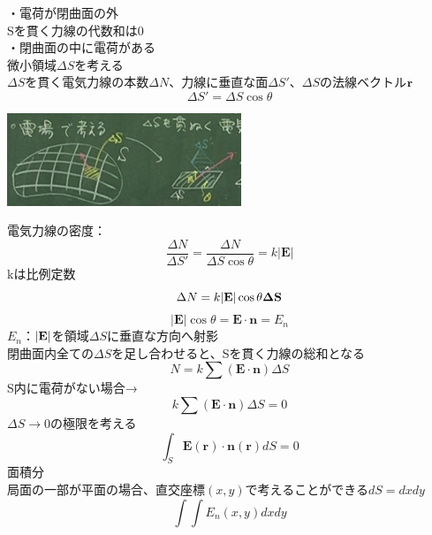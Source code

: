 \documentclass{jsarticle}
\begin{document}
		{\Large ・電荷が閉曲面の外}\\
		Sを貫く力線の代数和は{\Large 0}\\
		{\Large ・閉曲面の中に電荷がある}\\
		微小領域$\Delta S$を考える\\
		$\Delta S$を貫く電気力線の本数$\Delta N$、力線に垂直な面$\Delta S'$、$\Delta S$の法線ベクトル$\bf r$\\
		\[
			\Delta S'=\Delta S \cos \theta
		\]
		\begin{center}
			\includegraphics[width=7cm]{5_10_10.JPG}
		\end{center}
		電気力線の密度：
		\[
			\frac{\Delta N}{\Delta S'}=\frac{\Delta N}{\Delta S\cos \theta}=k|\bm{E}|
		\]
		kは比例定数
		\[
			\Delta N=k|\bf E|\cos \theta \Delta S
		\]
		\[
			|\bm{E}|\cos \theta=\bm{E}\cdot \bm{n}=E_n
		\]
		$E_n$：$|\bf{E}|$を領域$\Delta S$に垂直な方向へ射影\\
		閉曲面内全ての$\Delta S$を足し合わせると、Sを貫く力線の総和となる\\
		\[
			N=k\sum (\bm{E}\cdot \bm{n})\Delta S
		\]
		S内に電荷がない場合→
		\[
			k\sum (\bm{E}\cdot \bm{n})\Delta S=0
		\]
		$\Delta S→0$の極限を考える
		\[
			\int_S {\bm{E}(\bm{r})\cdot \bm{n}(\bm{r})}dS = 0
		\]
		面積分\\
		局面の一部が平面の場合、直交座標$(x,y)$で考えることができる$dS=dxdy$
		\[
			\int\int E_n(x,y)dxdy
		\]
\end{document}
